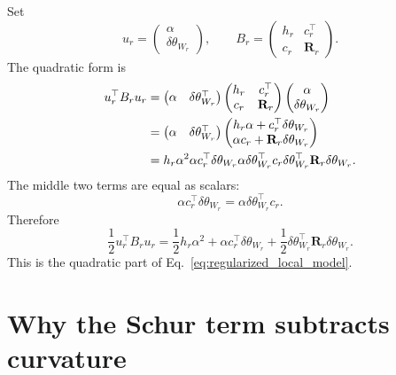 \documentclass[10pt,twocolumn]{article}
\begin{document}
Set
\begin{equation}
u_r=
\begin{pmatrix}
\alpha\\
\delta\theta_{W_r}
\end{pmatrix},
\qquad
B_r=
\begin{pmatrix}
h_r&c_r^\top\\
c_r&\mathbf R_r
\end{pmatrix}.
\label{eq:block_objects_appendix}
\end{equation}
The quadratic form is
\begin{align}
u_r^\top B_ru_r
&=
\begin{pmatrix}
\alpha&\delta\theta_{W_r}^\top
\end{pmatrix}
\begin{pmatrix}
h_r&c_r^\top\\
c_r&\mathbf R_r
\end{pmatrix}
\begin{pmatrix}
\alpha\\
\delta\theta_{W_r}
\end{pmatrix}
\notag\\
&=
\begin{pmatrix}
\alpha&\delta\theta_{W_r}^\top
\end{pmatrix}
\begin{pmatrix}
h_r\alpha+c_r^\top\delta\theta_{W_r}\\
\alpha c_r+\mathbf R_r\delta\theta_{W_r}
\end{pmatrix}
\notag\\
&=
h_r\alpha^2
\alpha c_r^\top\delta\theta_{W_r}
\alpha\delta\theta_{W_r}^\top c_r
\delta\theta_{W_r}^\top\mathbf R_r\delta\theta_{W_r}.
\label{eq:block_expand_appendix}
\end{align}
The middle two terms are equal as scalars:
\begin{equation}
\alpha c_r^\top\delta\theta_{W_r}
=
\alpha\delta\theta_{W_r}^\top c_r.
\label{eq:mixed_scalar_equal}
\end{equation}
Therefore
\begin{equation}
\frac12u_r^\top B_ru_r
=
\frac12h_r\alpha^2
+\alpha c_r^\top\delta\theta_{W_r}
+\frac12\delta\theta_{W_r}^\top\mathbf R_r\delta\theta_{W_r}.
\label{eq:block_half_expand}
\end{equation}
This is the quadratic part of Eq.~\eqref{eq:regularized_local_model}.

\section{Why the Schur term subtracts curvature}
\end{document}
